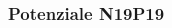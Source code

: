 \begin{frame}
\frametitle{Potenziale N19P19}
\begin{columns}

\begin{column}{0.3 \textwidth}
\begin{center}
\begin{figure}[!h]
          \end{figure}
\end{center}
\end{column}

\begin{column}{0.3 \textwidth}
\begin{center}
\begin{figure}[!h]
\end{figure}
\end{center}
\end{column}

\begin{column}{0.3 \textwidth}
\begin{center}
\begin{figure}[!h]
\end{figure}
\end{center}
\end{column}

\end{columns}

\end{frame}



